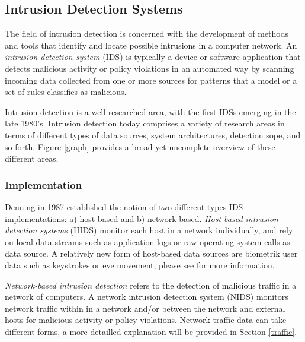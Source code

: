 \documentclass[a4paper,12pt,twoside]{article}
\begin{document}
\subsection{Intrusion Detection Systems}

The field of intrusion detection is concerned with the development of methods and tools that identify and locate possible intrusions in a computer network. An \textit{intrusion detection system} (IDS) is typically a device or software application that detects malicious activity or policy violations in an automated way by scanning incoming data collected from one or more sources for patterns that a model or a set of rules classifies as malicious.

Intrusion detection is a well researched area, with the first IDSs emerging in the late 1980's. Intrusion detection today comprises a variety of research areas in terms of different types of data sources, system architectures, detection sope, and so forth. Figure \ref{graph} provides a broad yet uncomplete overview of these different areas. 

\subsubsection*{Implementation}

Denning \cite{denning1987intrusion} in 1987 established the notion of two different types IDS implementations: a) host-based and b) network-based. 
\textit{Host-based intrusion detection systems} (HIDS) monitor each host in a network individually, and rely on local data streams such as application logs or raw operating system calls as  data source. A relatively new form of host-based data sources are biometrik user data such as keystrokes or eye movement, please see \cite{peng_user_2016} for more information.

\textit{Network-based intrusion detection} refers to the detection of malicious traffic in a network of computers. A network intrusion detection system (NIDS) monitors network traffic within in a network and/or between the network and external hosts for malicious activity or policy violations. Network traffic data can take different forms, a more detailled explanation will be provided in Section \ref{traffic}.
\end{document}
